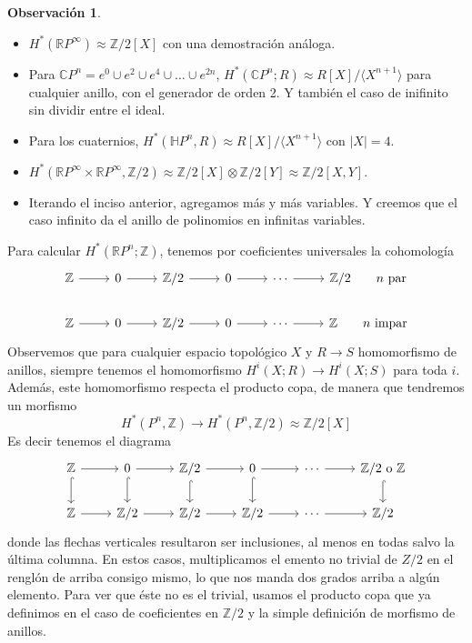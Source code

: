 \documentclass[spanish]{book}
\theoremstyle{definition}
\newtheorem*{obs}{Observación}
\newcommand{\R}{\mathbb{R}}
\newcommand{\Z}{\mathbb{Z}}
\newcommand{\C}{\mathbb{C}}
\begin{document}
\begin{obs}\leavevmode
	\begin{itemize}
	\item $H^*(\R P^\infty)\approx\Z/2[X]$ con una demostración análoga.
	
	\item Para $\C P^n=e^0\cup e^2\cup e^4\cup\ldots\cup e^{2n}$, $H^*(\C P^n;R)\approx R[X]/\langle X^{n+1}\rangle$ para cualquier anillo, con el generador de orden 2. Y también el caso de inifinito sin dividir entre el ideal.
	
	\item Para los cuaternios, $H^*(\mathbb{H}P^n,R)\approx R[X]/\langle X^{n+1}\rangle$ con $|X|=4$.
	
	\item $H^*(\R P^\infty\times\R P^\infty,\Z/2)\approx\Z/2[X]\otimes\Z/2[Y]\approx\Z/2[X,Y]$.
	
	\item Iterando el inciso anterior, agregamos más y más variables. Y creemos que el caso infinito da el anillo de polinomios en infinitas variables.
	\end{itemize}
\end{obs}
Para calcular $H^*(\R P^n;\Z)$, tenemos por coeficientes universales la cohomología
\[\begin{tikzcd}
	\Z\arrow[r]&0\arrow[r]&\Z/2\arrow[r]&0\arrow[r]&\cdots\arrow[r]&\Z/2\qquad n\text{ par}\\
	\Z\arrow[r]&0\arrow[r]&\Z/2\arrow[r]&0\arrow[r]&\cdots\arrow[r]&\Z\qquad n\text{ impar}
\end{tikzcd}\]
Observemos que para cualquier espacio topológico $X$ y $R\to S$ homomorfismo de anillos, siempre tenemos el homomorfismo $H^i(X;R)\to H^i(X;S)$ para toda $i$. Además, este homomorfismo respecta el producto copa, de manera que tendremos un morfismo
\[H^*(P^n,\Z)\to H^*(P^n,\Z/2)\approx\Z/2[X]\]
Es decir tenemos el diagrama
\[\begin{tikzcd}
	\Z\arrow[r]\arrow[d,hook]&0\arrow[r]\arrow[d,hook]&\Z/2\arrow[r]\arrow[d,hook]&0\arrow[r]\arrow[d,hook]&\cdots\arrow[r]&\Z/2\text{ o }\Z\arrow[d,hook]\\
	\Z\arrow[r]&\Z/2\arrow[r]&\Z/2\arrow[r]&\Z/2\arrow[r]&\cdots\arrow[r]&\Z/2
\end{tikzcd}\]
donde las flechas verticales resultaron ser inclusiones, al menos en todas salvo la última columna. En estos casos, multiplicamos el emento no trivial de $Z/2$ en el renglón de arriba consigo mismo, lo que nos manda dos grados arriba a algún elemento. Para ver que éste no es el trivial, usamos el producto copa que ya definimos en el caso de coeficientes en $\Z/2$ y la simple definición de morfismo de anillos.
\end{document}
